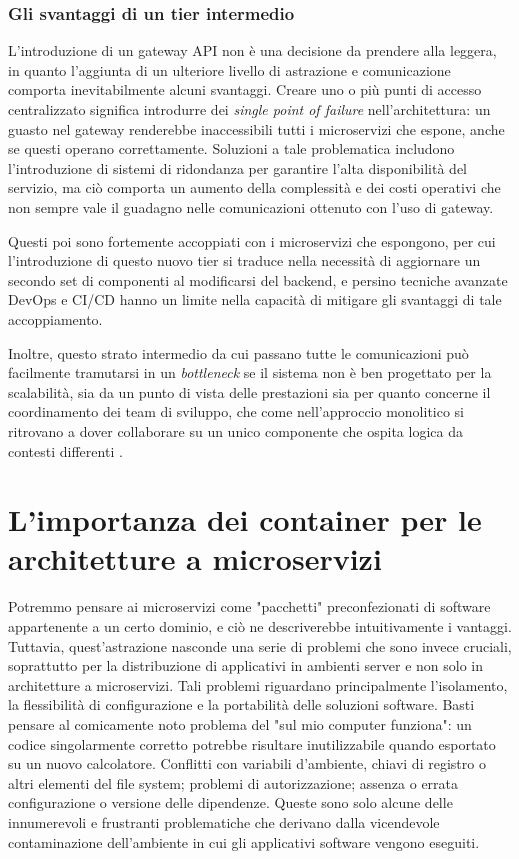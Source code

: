\subsubsection{Gli svantaggi di un tier intermedio}
L'introduzione di un gateway API non è una decisione da prendere alla leggera, in quanto l'aggiunta di un ulteriore livello di astrazione e comunicazione comporta inevitabilmente alcuni svantaggi.
Creare uno o più punti di accesso centralizzato significa introdurre dei \emph{single point of failure} nell'architettura: un guasto nel gateway renderebbe inaccessibili tutti i microservizi che espone, anche se questi operano correttamente. Soluzioni a tale problematica includono l'introduzione di sistemi di ridondanza per garantire l'alta disponibilità del servizio, ma ciò comporta un aumento della complessità e dei costi operativi che non sempre vale il guadagno nelle comunicazioni ottenuto con l'uso di gateway.

Questi poi sono fortemente accoppiati con i microservizi che espongono, per cui l'introduzione di questo nuovo tier si traduce nella necessità di aggiornare un secondo set di componenti al modificarsi del backend, e persino tecniche avanzate DevOps e CI/CD hanno un limite nella capacità di mitigare gli svantaggi di tale accoppiamento.

Inoltre, questo strato intermedio da cui passano tutte le comunicazioni può facilmente tramutarsi in un \emph{bottleneck} se il sistema non è ben progettato per la scalabilità, sia da un punto di vista delle prestazioni sia per quanto concerne il coordinamento dei team di sviluppo, che come nell'approccio monolitico si ritrovano a dover collaborare su un unico componente che ospita logica da contesti differenti \cite[pp.47-48]{.NET_Microservices}.


\section{L'importanza dei container per le architetture a microservizi}
Potremmo pensare ai microservizi come "pacchetti" preconfezionati di software appartenente a un certo dominio, e ciò ne descriverebbe intuitivamente i vantaggi. Tuttavia, quest'astrazione nasconde una serie di problemi che sono invece cruciali, soprattutto per la distribuzione di applicativi in ambienti server e non solo in architetture a microservizi.
Tali problemi riguardano principalmente l'isolamento, la flessibilità di configurazione e la portabilità delle soluzioni software. Basti pensare al comicamente noto problema del "sul mio computer funziona": un codice singolarmente corretto potrebbe risultare inutilizzabile quando esportato su un nuovo calcolatore.
Conflitti con variabili d'ambiente, chiavi di registro o altri elementi del file system; problemi di autorizzazione; assenza o errata configurazione o versione delle dipendenze. Queste sono solo alcune delle innumerevoli e frustranti problematiche che derivano dalla vicendevole contaminazione dell'ambiente in cui gli applicativi software vengono eseguiti.

